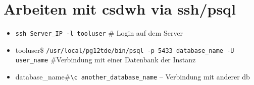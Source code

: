    \section{Arbeiten mit \acs{csdwh} via ssh/psql}
   
   \begin{itemize}
   	\item \texttt{ssh Server\_IP -l tooluser} \# Login auf dem Server
   	\item tooluser\$ \texttt{/usr/local/pg12tde/bin/psql -p 5433 database\_name -U user\_name} \#Verbindung mit einer Datenbank der Instanz 
   	\item database\_name\#\texttt{\textbackslash c another\_database\_name} -- Verbindung mit anderer \ac{db}
   \end{itemize}
